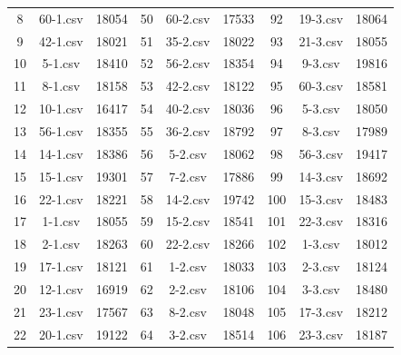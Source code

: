 \begin{longtable}{|c|c|c|c|c|c|c|c|c|}
  8           & 60-1.csv       & 18054         & 50          & 60-2.csv       & 17533         & 92          & 19-3.csv       & 18064         \\
  9           & 42-1.csv       & 18021         & 51          & 35-2.csv       & 18022         & 93          & 21-3.csv       & 18055         \\
  10          & 5-1.csv        & 18410         & 52          & 56-2.csv       & 18354         & 94          & 9-3.csv        & 19816         \\
  11          & 8-1.csv        & 18158         & 53          & 42-2.csv       & 18122         & 95          & 60-3.csv       & 18581         \\
  12          & 10-1.csv       & 16417         & 54          & 40-2.csv       & 18036         & 96          & 5-3.csv        & 18050         \\
  13          & 56-1.csv       & 18355         & 55          & 36-2.csv       & 18792         & 97          & 8-3.csv        & 17989         \\
  14          & 14-1.csv       & 18386         & 56          & 5-2.csv        & 18062         & 98          & 56-3.csv       & 19417         \\
  15          & 15-1.csv       & 19301         & 57          & 7-2.csv        & 17886         & 99          & 14-3.csv       & 18692         \\
  16          & 22-1.csv       & 18221         & 58          & 14-2.csv       & 19742         & 100         & 15-3.csv       & 18483         \\
  17          & 1-1.csv        & 18055         & 59          & 15-2.csv       & 18541         & 101         & 22-3.csv       & 18316         \\
  18          & 2-1.csv        & 18263         & 60          & 22-2.csv       & 18266         & 102         & 1-3.csv        & 18012         \\
  19          & 17-1.csv       & 18121         & 61          & 1-2.csv        & 18033         & 103         & 2-3.csv        & 18124         \\
  20          & 12-1.csv       & 16919         & 62          & 2-2.csv        & 18106         & 104         & 3-3.csv        & 18480         \\
  21          & 23-1.csv       & 17567         & 63          & 8-2.csv        & 18048         & 105         & 17-3.csv       & 18212         \\
  22          & 20-1.csv       & 19122         & 64          & 3-2.csv        & 18514         & 106         & 23-3.csv       & 18187         \\

\end{longtable}
